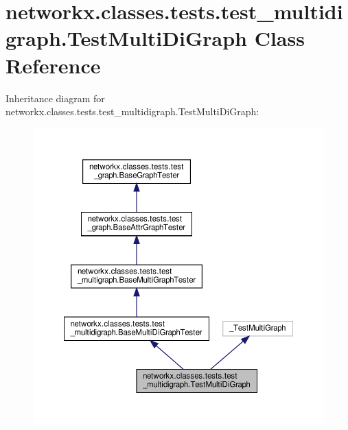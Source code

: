 \hypertarget{classnetworkx_1_1classes_1_1tests_1_1test__multidigraph_1_1TestMultiDiGraph}{}\section{networkx.\+classes.\+tests.\+test\+\_\+multidigraph.\+Test\+Multi\+Di\+Graph Class Reference}
\label{classnetworkx_1_1classes_1_1tests_1_1test__multidigraph_1_1TestMultiDiGraph}


Inheritance diagram for networkx.\+classes.\+tests.\+test\+\_\+multidigraph.\+Test\+Multi\+Di\+Graph\+:
\nopagebreak
\begin{figure}[H]
\begin{center}
\leavevmode
\includegraphics[width=350pt]{classnetworkx_1_1classes_1_1tests_1_1test__multidigraph_1_1TestMultiDiGraph__inherit__graph}
\end{center}
\end{figure}


